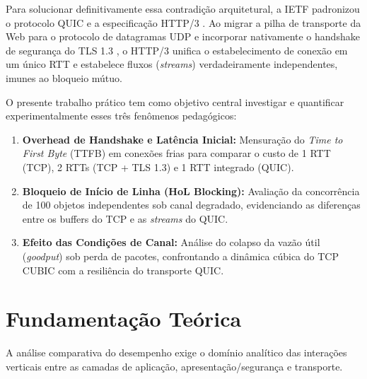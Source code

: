 \documentclass[12pt]{article}
\begin{document}
Para solucionar definitivamente essa contradição arquitetural, a IETF padronizou o protocolo QUIC \cite{rfc9000, rfc9001} e a especificação HTTP/3 \cite{rfc9114}. Ao migrar a pilha de transporte da Web para o protocolo de datagramas UDP e incorporar nativamente o handshake de segurança do TLS 1.3 \cite{rfc8446}, o HTTP/3 unifica o estabelecimento de conexão em um único RTT e estabelece fluxos (\textit{streams}) verdadeiramente independentes, imunes ao bloqueio mútuo.

O presente trabalho prático tem como objetivo central investigar e quantificar experimentalmente esses três fenômenos pedagógicos:
\begin{enumerate}
    \item \textbf{Overhead de Handshake e Latência Inicial:} Mensuração do \textit{Time to First Byte} (TTFB) em conexões frias para comparar o custo de 1 RTT (TCP), 2 RTTs (TCP + TLS 1.3) e 1 RTT integrado (QUIC).
    \item \textbf{Bloqueio de Início de Linha (HoL Blocking):} Avaliação da concorrência de 100 objetos independentes sob canal degradado, evidenciando as diferenças entre os buffers do TCP e as \textit{streams} do QUIC.
    \item \textbf{Efeito das Condições de Canal:} Análise do colapso da vazão útil (\textit{goodput}) sob perda de pacotes, confrontando a dinâmica cúbica do TCP CUBIC com a resiliência do transporte QUIC.
\end{enumerate}

\section{Fundamentação Teórica}

A análise comparativa do desempenho exige o domínio analítico das interações verticais entre as camadas de aplicação, apresentação/segurança e transporte.
\end{document}
